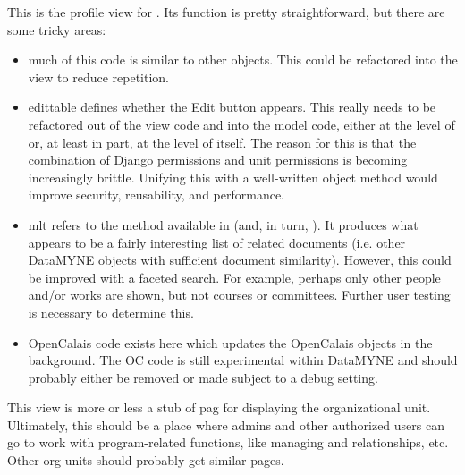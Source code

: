 \documentclass[letterpaper,10pt,english]{sphinxmanual}
\begin{document}

\begin{fulllineitems}
\label{generated/apps.profiles.views:apps.profiles.views.view_profile}
This is the profile view for .  Its function is pretty
straightforward, but there are some tricky areas:
\begin{itemize}
\item {} 
much of this code is similar to other  objects.  This could be
refactored into the  view to reduce repetition.

\item {} 
edittable defines whether the Edit button appears.  This really needs
to be refactored out of the view code and into the model code, either
at the level of  or, at least in part, at the level of
 itself.  The reason for this is that the combination of 
Django permissions and unit permissions is becoming increasingly brittle.
Unifying this with a well-written object method would improve security,
reusability, and performance.

\item {} 
mlt refers to the  method available in  
(and, in turn, ).  It produces what appears to be a fairly interesting
list of related documents (i.e. other DataMYNE objects with sufficient
document similarity).  However, this could be improved with a faceted search.
For example, perhaps only other people and/or works are shown, but not courses
or committees.  Further user testing is necessary to determine this.

\item {} 
OpenCalais code exists here which updates the OpenCalais objects in
the background.  The OC code is still experimental within DataMYNE and
should probably either be removed or made subject to a debug setting.

\end{itemize}

\end{fulllineitems}



\begin{fulllineitems}
\label{generated/apps.profiles.views:apps.profiles.views.view_program}
This view is more or less a stub of pag for displaying the 
organizational unit.  Ultimately, this should be a place where admins and other
authorized users can go to work with program-related functions, like managing
 and  relationships, etc.  Other org units should 
probably get similar pages.

\end{fulllineitems}
\end{document}

